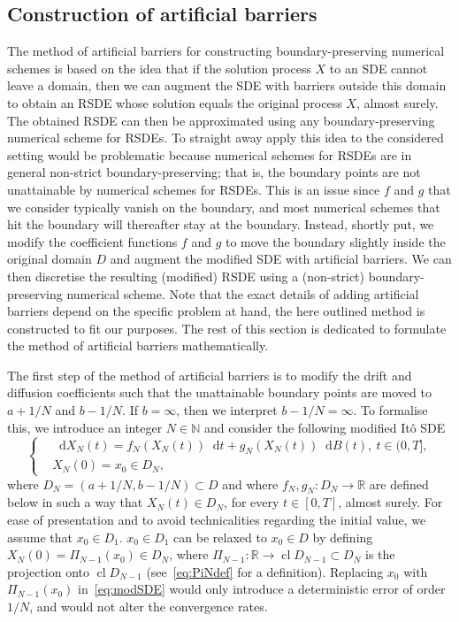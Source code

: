 \documentclass[11pt]{amsart}
\newcommand*\diff{\mathop{}\!\mathrm{d}}
\newcommand{\DDN}{D_{N}}
\begin{document}
{\subsection{Construction of artificial barriers}
The method of artificial barriers for constructing boundary-preserving numerical schemes is based on the idea that if the solution process $X$ to an SDE cannot leave a domain, then we can augment the SDE with barriers outside this domain to obtain an RSDE whose solution equals the original process $X$, almost surely. The obtained RSDE can then be approximated using any boundary-preserving numerical scheme for RSDEs. To straight away apply this idea to the considered setting would be problematic because numerical schemes for RSDEs are in general non-strict boundary-preserving; that is, the boundary points are not unattainable by numerical schemes for RSDEs. This is an issue since $f$ and $g$ that we consider typically vanish on the boundary, and most numerical schemes that hit the boundary will thereafter stay at the boundary. Instead, shortly put, we modify the coefficient functions $f$ and $g$ to move the boundary slightly inside the original domain $D$ and augment the modified SDE with artificial barriers. We can then discretise the resulting (modified) RSDE using a (non-strict) boundary-preserving numerical scheme. Note that the exact details of adding artificial barriers depend on the specific problem at hand, the here outlined method is constructed to fit our purposes. The rest of this section is dedicated to formulate the method of artificial barriers mathematically.

The first step of the method of artificial barriers is to modify the drift and diffusion coefficients such that the unattainable boundary points are moved to $a + 1/N$ and $b - 1/N$. If $b = \infty$, then we interpret $b - 1/N = \infty$. To formalise this, we introduce an integer $N \in \mathbb{N}$ and consider the following modified Itô SDE
\begin{equation}\label{eq:modSDE}
\left\lbrace
\begin{aligned}
& \diff X_{N}(t) = f_{N}(X_{N}(t)) \diff t + g_{N}(X_{N}(t)) \diff B(t),\ t \in (0,T], \\ 
& X_{N}(0) = x_{0} \in \DDN,
\end{aligned}
\right.
\end{equation}
where $\DDN = (a + 1/N,b-1/N) \subset D$ and where $f_{N}, g_{N} : \DDN \to \mathbb{R}$ are defined below in such a way that $X_{N}(t) \in \DDN$, for every $t \in [0,T]$, almost surely. For ease of presentation and to avoid technicalities regarding the initial value, we assume that $x_{0} \in D_{1}$. $x_{0} \in D_{1}$ can be relaxed to $x_{0} \in D$ by defining $X_{N}(0) = \Pi_{N-1}(x_{0}) \in \DDN$, where $\Pi_{N-1}: \mathbb{R} \to \operatorname{cl} D_{N-1} \subset \DDN$ is the projection onto $\operatorname{cl} D_{N-1}$ (see~\eqref{eq:PiNdef} for a definition). Replacing $x_{0}$ with $\Pi_{N-1}(x_{0})$ in~\eqref{eq:modSDE} would only introduce a deterministic error of order $1/N$, and would not alter the convergence rates. 

}
\end{document}
